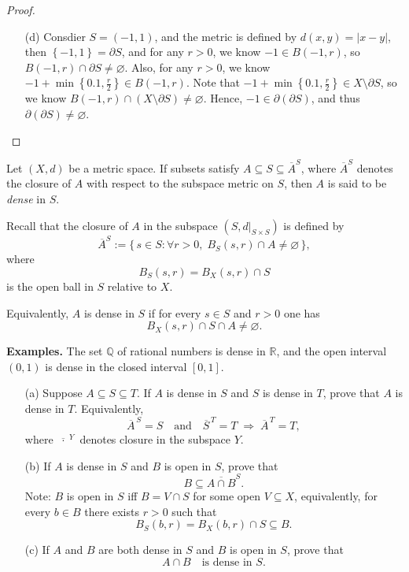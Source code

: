\begin{proof}
\begin{itemize}
    \item [(d)] Consdier \(S = (-1, 1)\), and the metric is defined by \(d(x,y) = \vert x-y \vert \), then \(\left\{ -1, 1 \right\} = \partial S\), and for any \(r > 0\), we know \(-1 \in B(-1, r)\), so \(B(-1, r) \cap \partial S \neq \varnothing \). Also, for any \(r > 0\), we know \(-1 + \min \left\{ 0.1, \frac{r}{2} \right\} \in B(-1, r)\). Note that \(-1 + \min \left\{ 0.1, \frac{r}{2} \right\} \in X\setminus \partial S\), so we know \(B(-1, r) \cap (X\setminus \partial S) \neq \varnothing \). Hence, \(-1 \in \partial (\partial S)\), and thus \(\partial (\partial S) \neq \varnothing \).           
  \end{itemize}
\end{proof}
\begin{problem}[21 pts]
Let $(X,d)$ be a metric space.  
If subsets satisfy $A \subseteq S \subseteq \overline{A}^S$,  
where $\overline{A}^S$ denotes the closure of $A$ with respect to the subspace metric on $S$,  
then $A$ is said to be \emph{dense} in $S$.  

Recall that the closure of $A$ in the subspace $(S,d|_{S\times S})$ is defined by
\[
\overline{A}^S := \{\, s \in S : \forall r>0,\; B_S(s,r)\cap A \neq \varnothing \,\},
\]
where
\[
B_S(s,r) = B_X(s,r)\cap S
\]
is the open ball in $S$ relative to $X$.  

Equivalently, $A$ is dense in $S$ if for every $s\in S$ and $r>0$ one has
\[
B_X(s,r)\cap S \cap A \neq \varnothing.
\]

\medskip
\noindent
\textbf{Examples.}  
The set $\mathbb{Q}$ of rational numbers is dense in $\mathbb{R}$,  
and the open interval $(0,1)$ is dense in the closed interval $[0,1]$.

\begin{enumerate}
  \item[(a)] Suppose $A \subseteq S \subseteq T$.  
  If $A$ is dense in $S$ and $S$ is dense in $T$, prove that $A$ is dense in $T$.  
  Equivalently,
  \[
  \overline{A}^{\,S}=S 
  \quad\text{and}\quad 
  \overline{S}^{\,T}=T
  \;\Longrightarrow\;
  \overline{A}^{\,T}=T,
  \]
  where $\overline{\;\cdot\;}^{\,Y}$ denotes closure in the subspace $Y$.

  \item[(b)] If $A$ is dense in $S$ and $B$ is open in $S$, prove that
  \[
  B \subseteq \overline{A \cap B}^S.
  \]
  Note: $B$ is open in $S$ iff $B=V\cap S$ for some open $V \subseteq X$,  
  equivalently, for every $b \in B$ there exists $r>0$ such that
  \[
  B_S(b,r) = B_X(b,r)\cap S \subseteq B.
  \]

  \item[(c)] If $A$ and $B$ are both dense in $S$ and $B$ is open in $S$, prove that
  \[
  A \cap B \quad \text{is dense in } S.
  \]
\end{enumerate}  

\end{problem}
